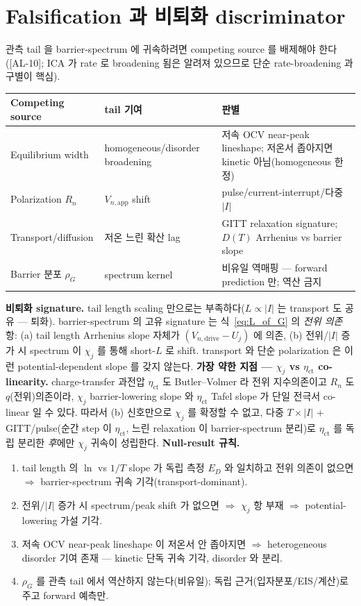 \documentclass[11pt,a4paper]{article}
\newcommand{\app}{\mathrm{app}}
\newcommand{\drive}{\mathrm{drive}}
\newcommand{\AL}[1]{\textsf{[AL-#1]}}
\begin{document}
\section{Falsification 과 비퇴화 discriminator}\label{sec:falsify}
관측 tail 을 barrier-spectrum 에 귀속하려면 competing source 를 배제해야 한다(\AL{10}; ICA 가 rate 로
broadening 됨은 알려져 있으므로 \cite{dubarry2022,fly2020} 단순 rate-broadening 과 구별이 핵심).
\begin{longtable}{p{} p{} p{}}
\toprule Competing source & tail 기여 & 판별 \\ \midrule \endhead
Equilibrium width & homogeneous/disorder broadening & 저속 OCV near-peak lineshape; 저온서 좁아지면 kinetic 아님(homogeneous 한정) \\
Polarization $R_n$ & $V_{n,\app}$ shift & pulse/current-interrupt/다중 $|I|$ \\
Transport/diffusion & 저온 느린 확산 lag & GITT relaxation signature; $D(T)$ Arrhenius vs barrier slope \\
Barrier 분포 $\rho_G$ \cite{plonka2001} & spectrum kernel & 비유일 역매핑 — forward prediction 만; 역산 금지 \\
\bottomrule
\end{longtable}
\textbf{비퇴화 signature.} tail length scaling 만으로는 부족하다($L\propto|I|$ 는 transport 도 공유 —
퇴화). barrier-spectrum 의 고유 signature 는 식~\eqref{eq:L_of_G} 의 \emph{전위 의존} 항: (a) tail length
Arrhenius slope 자체가 $(V_{n,\drive}-U_j)$ 에 의존, (b) 전위/$|I|$ 증가 시 spectrum 이 $\chi_j$ 를 통해
short-$L$ 로 shift. transport 와 단순 polarization 은 이런 potential-dependent slope 를 갖지 않는다.
\textbf{가장 약한 지점 — $\chi_j$ vs $\eta_\mathrm{ct}$ co-linearity.} charge-transfer 과전압
$\eta_\mathrm{ct}$ 도 Butler--Volmer 라 전위 지수의존이고 $R_n$ 도 $q$(전위)의존이라, $\chi_j$
barrier-lowering slope 와 $\eta_\mathrm{ct}$ Tafel slope 가 단일 전극서 co-linear 일 수 있다. 따라서 (b)
신호만으로 $\chi_j$ 를 확정할 수 없고, 다중 $T\times|I|$ + GITT/pulse(순간 step 이 $\eta_\mathrm{ct}$, 느린
relaxation 이 barrier-spectrum 분리)로 $\eta_\mathrm{ct}$ 를 독립 분리한 \emph{후}에만 $\chi_j$ 귀속이 성립한다.
\textbf{Null-result 규칙.}
\begin{enumerate}[label=(N\arabic*),leftmargin=2.2em]
\item tail length 의 $\ln$ vs $1/T$ slope 가 독립 측정 $E_D$ 와 일치하고 전위 의존이 없으면 $\Rightarrow$
  barrier-spectrum 귀속 기각(transport-dominant).
\item 전위/$|I|$ 증가 시 spectrum/peak shift 가 없으면 $\Rightarrow$ $\chi_j$ 항 부재 $\Rightarrow$
  potential-lowering 가설 기각.
\item 저속 OCV near-peak lineshape 이 저온서 안 좁아지면 $\Rightarrow$ heterogeneous disorder 기여 존재 —
  kinetic 단독 귀속 기각, disorder 와 분리.
\item $\rho_G$ 를 관측 tail 에서 역산하지 않는다(비유일); 독립 근거(입자분포/EIS/계산)로 주고 forward 예측만.
\end{enumerate}
\end{document}
